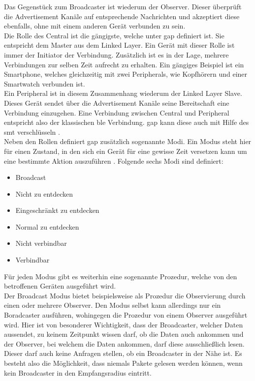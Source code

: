 \noindent Das Gegenstück zum Broadcaster ist wiederum der Observer. Dieser überprüft die Advertisement Kanäle auf entsprechende Nachrichten und akzeptiert diese ebenfalls, ohne mit einem anderen Gerät verbunden zu sein.\\

\noindent Die Rolle des Central ist die gängigste, welche unter \ac{gap} definiert ist. Sie entspricht dem Master aus dem Linked Layer. Ein Gerät mit dieser Rolle ist immer der Initiator der Verbindung. Zusätzlich ist es in der Lage, mehrere Verbindungen zur selben Zeit aufrecht zu erhalten. Ein gängiges Beispiel ist ein Smartphone, welches gleichzeitig mit zwei Peripherals, wie Kopfhörern und einer Smartwatch verbunden ist.\\

\noindent Ein Peripheral ist in diesem Zusammenhang wiederum der Linked Layer Slave. Dieses Gerät sendet über die Advertisement Kanäle seine Bereitschaft eine Verbindung einzugehen. Eine Verbindung zwischen Central und Peripheral entspricht also der klassischen \ac{ble} Verbindung. \ac{gap} kann diese auch mit Hilfe des \ac{smt} verschlüsseln \cite[Seite 34]{Usama17:BBS}.\\  

\noindent Neben den Rollen definiert \ac{gap} zusätzlich sogenannte Modi. Ein Modus steht hier für einen Zustand, in den sich ein Gerät für eine gewisse Zeit versetzen kann um eine bestimmte Aktion auszuführen \cite[Seite 35]{Townsend14:GSB}. Folgende sechs Modi sind definiert:
\begin{itemize}
	\item{Broadcast}
	\item{Nicht zu entdecken}
	\item{Eingeschränkt zu entdecken}
	\item{Normal zu entdecken}
	\item{Nicht verbindbar}
	\item{Verbindbar}
\end{itemize} 
Für jeden Modus gibt es weiterhin eine sogenannte Prozedur, welche von den betroffenen Geräten ausgeführt wird.\\

\noindent Der Broadcast Modus bietet beispielsweise als Prozedur die Observierung durch einen oder mehrere Observer. Den Modus selbst kann allerdings nur ein Boradcaster ausführen, wohingegen die Prozedur von einem Observer ausgeführt wird. Hier ist von besonderer Wichtigkeit, dass der Broadcaster, welcher Daten aussendet, zu keinem Zeitpunkt wissen darf, ob die Daten auch ankommen und der Observer, bei welchem die Daten ankommen, darf diese ausschließlich lesen. Dieser darf auch keine Anfragen stellen, ob ein Broadcaster in der Nähe ist. Es besteht also die Möglichkeit, dass niemals Pakete gelesen werden können, wenn kein Broadcaster in den Empfangsradius eintritt.\\

